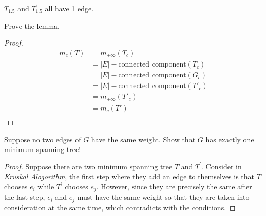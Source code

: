 $T_{1.5}$ and $T_{1.5}^{\prime}$ all have 1 edge.

\begin{exercise}
Prove the lemma.
\end{exercise}
\begin{proof}
$$
    \begin{aligned}
    m_c(T) & = m_{+\infty}(T_c)\\
    & = |E|-\text{connected component}(T_c)\\
    & = |E|-\text{connected component}(G_c)\\
    & = |E|-\text{connected component}(T'_c)\\
    & = m_{+\infty}(T'_c)\\
    & = m_c(T')\\
    \end{aligned}
$$
\end{proof}

\begin{exercise}
  Suppose no two edges of $G$ have the same weight.
  Show that $G$ has exactly one minimum spanning tree!
\end{exercise}

\begin{proof}
    Suppose there are two minimum spanning tree $T$ and $T^{\prime}$. Consider in \emph{Kruskal Alogorithm}, the first step where they add an edge to themselves is that $T$ chooses $e_i$ while $T^{\prime}$ chooses $e_j$. However, since they are precisely the same after the last step, $e_i$ and $e_j$ must have the same weight so that they are taken into consideration at the same time, which contradicts with the conditions.
\end{proof}


